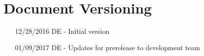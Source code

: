 \chapter*{Document Versioning}
\begin{enumerate}
    \item[12/28/2016] DE - Initial version
    \item[01/09/2017] DE - Updates for prerelease to development team
\end{enumerate}
